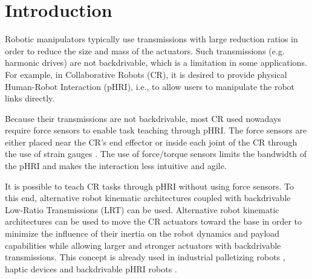 \documentclass[twocolumn,10pt]{asme2ej}
\begin{document}
\section{Introduction}
Robotic manipulators typically use transmissions with large reduction ratios in order to reduce the size and mass of the actuators. Such transmissions (e.g. harmonic drives) are not backdrivable, which is a limitation in some applications. For example, in Collaborative Robots (CR), it is desired to provide physical Human-Robot Interaction (pHRI), i.e., to allow users to manipulate the robot links directly. 
\par 
Because their transmissions are not backdrivable, most CR used nowadays require force sensors to enable task teaching through pHRI. The force sensors are either placed near the CR's end effector \cite{roveda2018high}\cite{meissner2018smart}\cite{raessa2019teaching} or inside each joint of the CR through the use of strain gauges \cite{loughlin2007dlr}. The use of force/torque sensors limits the bandwidth of the pHRI and makes the interaction less intuitive and agile. 
\par
It is possible to teach CR tasks through pHRI without using force sensors. To this end, alternative robot kinematic architectures coupled with backdrivable Low-Ratio Transmissions (LRT) can be used. Alternative robot kinematic architectures can be used to move the CR actuators toward the base in order to minimize the influence of their inertia on the robot dynamics and payload capabilities while allowing larger and stronger actuators with backdrivable transmissions. This concept is already used in industrial palletizing  robots \cite{xiaoqing2011mechanical}, haptic devices \cite{phantom}  and backdrivable pHRI robots \cite{wen2019kinematically}\cite{9306904}. 
\end{document}

